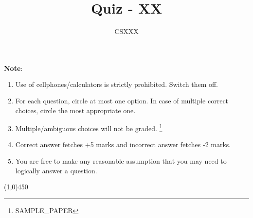 \documentclass[10pt, letterpaper]{article}
\begin{document}
\title{Quiz - XX}
\author{CSXXX}
\date{}

\maketitle
\vspace{-0.25in}


\textbf{Note}:
\begin{enumerate}
\item Use of cellphones/calculators is strictly prohibited. Switch them off.  
\item For each question, circle at most one option. In case of multiple correct choices, circle the most appropriate one.
\item Multiple/ambiguous choices will not be graded. {\let\thefootnote\relax\footnote{SAMPLE\_PAPER}}
\item Correct answer fetches +5 marks and incorrect answer fetches -2 marks.
\item You are free to make any reasonable assumption that you may need to logically answer a question.
\end{enumerate}
\vspace{-0.25in}
\begin{center}
\line(1,0){450}
\end{center}
\end{document}
